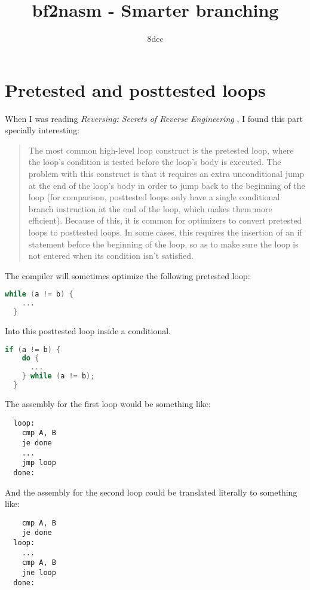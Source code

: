 \documentclass{amsart}
\title{bf2nasm - Smarter branching}
\author{8dcc}
\begin{document}
\maketitle

\section{Pretested and posttested loops}

When I was reading \textit{Reversing: Secrets of Reverse Engineering}
\cite{reversing}, I found this part specially interesting:

\begin{quote}
  The most common high-level loop construct is the pretested loop, where the
  loop's condition is tested before the loop's body is executed. The problem
  with this construct is that it requires an extra unconditional jump at the end
  of the loop's body in order to jump back to the beginning of the loop (for
  comparison, posttested loops only have a single conditional branch instruction
  at the end of the loop, which makes them more efficient). Because of this, it
  is common for optimizers to convert pretested loops to posttested loops. In
  some cases, this requires the insertion of an if statement before the
  beginning of the loop, so as to make sure the loop is not entered when its
  condition isn't satisfied.
\end{quote}

The compiler will sometimes optimize the following pretested loop:

\begin{lstlisting}[language=C]
  while (a != b) {
    ...
  }
\end{lstlisting}

Into this posttested loop inside a conditional.

\begin{lstlisting}[language=C]
  if (a != b) {
    do {
      ...
    } while (a != b);
  }
\end{lstlisting}

The assembly for the first loop would be something like:

\begin{lstlisting}
  loop:
    cmp A, B
    je done
    ...
    jmp loop
  done:
\end{lstlisting}

And the assembly for the second loop could be translated literally to something
like:

\begin{lstlisting}
    cmp A, B
    je done
  loop:
    ...
    cmp A, B
    jne loop
  done:
\end{lstlisting}
\end{document}
